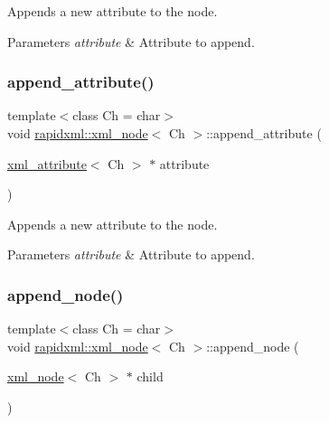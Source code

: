 Appends a new attribute to the node. 
\begin{DoxyParams}{Parameters}
{\em attribute} & Attribute to append. \\
\hline
\end{DoxyParams}
\mbox{\label{classrapidxml_1_1xml__node_a33ce3386f8c42dd4db658b75cbb6e6c4}} 
\subsubsection{\texorpdfstring{append\+\_\+attribute()}{append\_attribute()}\hspace{0.1cm}{\footnotesize\ttfamily [2/2]}}
{\footnotesize\ttfamily template$<$class Ch = char$>$ \\
void \mbox{\hyperlink{classrapidxml_1_1xml__node}{rapidxml\+::xml\+\_\+node}}$<$ Ch $>$\+::append\+\_\+attribute (\begin{DoxyParamCaption}\item[{\mbox{\hyperlink{classrapidxml_1_1xml__attribute}{xml\+\_\+attribute}}$<$ Ch $>$ $\ast$}]{attribute }\end{DoxyParamCaption})\hspace{0.3cm}{\ttfamily [inline]}}

Appends a new attribute to the node. 
\begin{DoxyParams}{Parameters}
{\em attribute} & Attribute to append. \\
\hline
\end{DoxyParams}
\mbox{\label{classrapidxml_1_1xml__node_a8696d098ecc9c4d2a646b43e91d58e31}} 
\subsubsection{\texorpdfstring{append\+\_\+node()}{append\_node()}\hspace{0.1cm}{\footnotesize\ttfamily [1/2]}}
{\footnotesize\ttfamily template$<$class Ch = char$>$ \\
void \mbox{\hyperlink{classrapidxml_1_1xml__node}{rapidxml\+::xml\+\_\+node}}$<$ Ch $>$\+::append\+\_\+node (\begin{DoxyParamCaption}\item[{\mbox{\hyperlink{classrapidxml_1_1xml__node}{xml\+\_\+node}}$<$ Ch $>$ $\ast$}]{child }\end{DoxyParamCaption})\hspace{0.3cm}{\ttfamily [inline]}}

